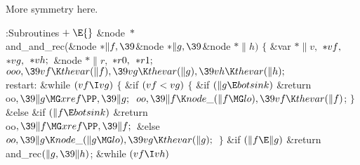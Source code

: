 More symmetry here.

\Y\B\4:Subroutines\X${}\mathrel+\E{}$\6
\&{node} ${}{*}{}$\\{and\_and\_rec}(\&{node} ${}{*}\|f,\39{}$\&{node} ${}{*}%
\|g,\39{}$\&{node} ${}{*}\|h){}$\1\1\2\2\6
${}\{{}$\1\6
\&{var} ${}{*}\|v,{}$ ${}{*}\\{vf},{}$ ${}{*}\\{vg},{}$ ${}{*}\\{vh};{}$\6
\&{node} ${}{*}\|r,{}$ ${}{*}\\{r0},{}$ ${}{*}\\{r1};{}$\7
${}\\{ooo},\39\\{vf}\K\\{thevar}(\|f),\39\\{vg}\K\\{thevar}(\|g),\39\\{vh}\K%
\\{thevar}(\|h);{}$\6
\4\\{restart}:\5
\&{while} ${}(\\{vf}\I\\{vg}){}$\5
${}\{{}$\1\6
\&{if} ${}(\\{vf}<\\{vg}){}$\5
${}\{{}$\1\6
\&{if} ${}(\|g\E\\{botsink}){}$\1\5
\&{return} \\{oo}${},\39\|g\MG\\{xref}\PP,\39\|g;{}$\2\6
${}\\{oo},\39\|f\K\\{node\_}(\|f\MG\\{lo}),\39\\{vf}\K\\{thevar}(\|f){}$;\6
\4${}\}{}$\2\6
\&{else} \&{if} ${}(\|f\E\\{botsink}){}$\1\5
\&{return} \\{oo}${},\39\|f\MG\\{xref}\PP,\39\|f;{}$\2\6
\&{else}\1\5
${}\\{oo},\39\|g\K\\{node\_}(\|g\MG\\{lo}),\39\\{vg}\K\\{thevar}(\|g);{}$\2\6
\4${}\}{}$\2\6
\&{if} ${}(\|f\E\|g){}$\1\5
\&{return} \\{and\_rec}${}(\|g,\39\|h){}$;\2\6
\&{while} ${}(\\{vf}\I\\{vh}){}$\5
